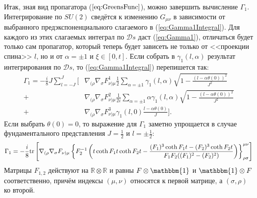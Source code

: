 
Итак, зная вид пропагатора  ($\ref{eq:GreensFunc}$), можно завершить вычисление $\Gamma_1$. Интегрирование по $SU(2)$ сведётся к изменению $G_{\mu \nu}$ в зависимости от выбранного предэкспоненциального слагаемого в (\ref{eq:Gamma1Integral}). Для каждого из этих слагаемых интеграл по $\mathcal{D}s$ даст (\ref{eq:Gamma1}), отличаться будет только сам пропагатор, который теперь будет зависеть не только от <<проекции спина>> $l$, но и от $\alpha=\pm1$ и $\xi\in[0,t]$. Если собрать в $\gamma_1(l,\alpha)$ результат интегрирования по $\mathcal{D}s$, то (\ref{eq:Gamma1Integral}) перепишется так:
\begin{equation*}
	\begin{split}
		\Gamma_1=-\frac i8 J \sum\limits_{l=-J}^J \Bigg[ &\nabla_{(\rho}\nabla_\sigma F_{\nu)\mu}^1 \frac12 \sum\limits_{\alpha=\pm1}\gamma_1(l,\alpha)\sqrt{1-\frac{(l-\alpha \theta(0))^2}{J^2}}\\
		+ &\nabla_{(\rho}\nabla_\sigma F_{\nu)\mu}^2 \frac{1}{2i} \sum\limits_{\alpha=\pm1}\alpha\gamma_1(l,\alpha)\sqrt{1-\frac{(l-\alpha \theta(0))^2}{J^2}}\\
		+ &\nabla_{(\rho}\nabla_\sigma F_{\nu)\mu}^3 \gamma_1(l,0) \frac{l-\alpha \theta(0)}{J}\Bigg].
	\end{split}
\end{equation*}
Если выбрать $\theta(0)=0$, то выражение для $\Gamma_1$ заметно упрощается в случае фундаментального представления $J=\frac12$ и $l=\pm \frac12$:
\begin{equation}
	\Gamma_1
	\label{eq:Gamma1Answer}
	=-\frac{i}{8}\mathrm{tr}\left[ \nabla_{(\rho}\nabla_\sigma F_{\nu)\mu} \left\{
			F_2^{-1}\left(
				t \coth{F_1t}\coth{F_2t} - \frac{(F_1)^3\coth{F_1t}-(F_2)^3\coth{F_2t}}{F_1F_2((F_1)^2 - (F_2)^2)}
			\right)
		\right\}_{\rho \sigma}^{\mu \nu}
	\right]
\end{equation}
Матрицы $F_{1,2}$ действуют на $\mathbb{R}\otimes\mathbb{R}$ и равны $F\otimes\mathbbm{1}$ и $\mathbbm{1}\otimes{F}$ соответственно, причём индексы $(\mu, \nu)$ относятся к первой матрице, а $(\sigma,\rho)$ ко второй.